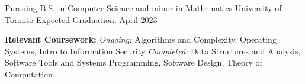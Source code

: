 
\begin{cventries}
  \cventry
    {Pursuing B.S. in Computer Science and minor in Mathematics } %
    {University of Toronto} %
    {} %
    {Expected Graduation: April 2023} %
    {
      \begin{cvitems} 
         \item {\textbf{Relevant Coursework:} \textit{Ongoing:} Algorithms and Complexity, Operating Systems, Intro to Information Security \newline \textit{Completed:} Data Structures and Analysis, Software Tools and Systems Programming, Software Design, Theory of Computation}. 
      \end{cvitems}
    }
\end{cventries}
